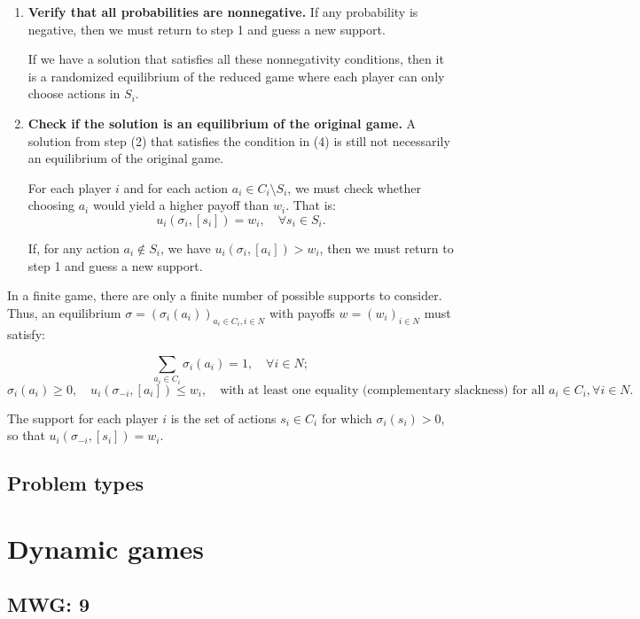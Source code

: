\documentclass{article}
\begin{document}
\begin{enumerate}
    \item \textbf{Verify that all probabilities are nonnegative.} If any probability is negative, then we must return to step 1 and guess a new support.

    If we have a solution that satisfies all these nonnegativity conditions, then it is a randomized equilibrium of the reduced game where each player can only choose actions in \( S_i \).

    \item \textbf{Check if the solution is an equilibrium of the original game.} A solution from step (2) that satisfies the condition in (4) is still not necessarily an equilibrium of the original game.

    For each player \( i \) and for each action \( a_i \in C_i \setminus S_i \), we must check whether choosing \( a_i \) would yield a higher payoff than \( w_i \). That is:
    \[
    u_i(\sigma_i, [s_i]) = w_i, \quad \forall s_i \in S_i.
    \]

    If, for any action \( a_i \notin S_i \), we have \( u_i(\sigma_i, [a_i]) > w_i \), then we must return to step 1 and guess a new support.

\end{enumerate}

In a finite game, there are only a finite number of possible supports to consider. Thus, an equilibrium \( \sigma = (\sigma_i(a_i))_{a_i \in C_i, i \in N} \) with payoffs \( w = (w_i)_{i \in N} \) must satisfy:

\[
\sum_{a_i \in C_i} \sigma_i(a_i) = 1, \quad \forall i \in N;
\]
\[
\sigma_i(a_i) \geq 0, \quad u_i(\sigma_{-i}, [a_i]) \leq w_i, \quad \text{with at least one equality (complementary slackness) for all } a_i \in C_i, \forall i \in N.
\]

The support for each player \( i \) is the set of actions \( s_i \in C_i \) for which \( \sigma_i(s_i) > 0 \), so that \( u_i(\sigma_{-i}, [s_i]) = w_i \).


\subsection{Problem types}



\section{Dynamic games}\label{DG} %
\subsection*{MWG: 9}
\end{document}
